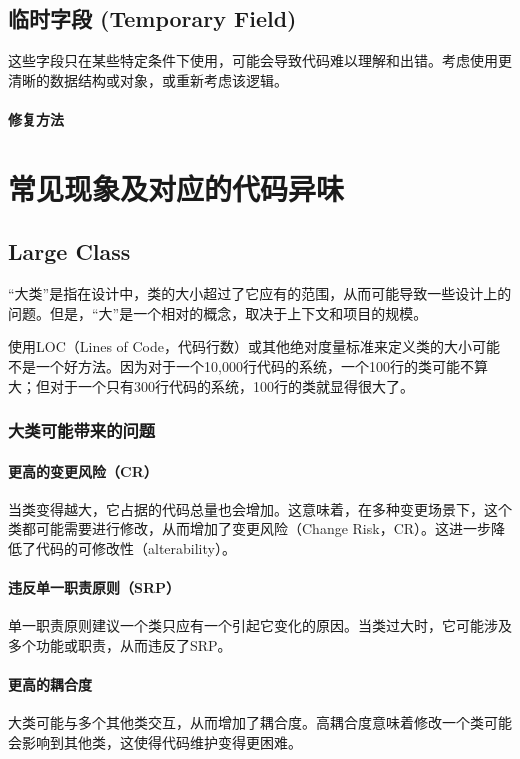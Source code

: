 \subsection{临时字段 (Temporary Field)}这些字段只在某些特定条件下使用，可能会导致代码难以理解和出错。考虑使用更清晰的数据结构或对象，或重新考虑该逻辑。
\paragraph{修复方法}

\section{常见现象及对应的代码异味}
\subsection{Large Class}
“大类”是指在设计中，类的大小超过了它应有的范围，从而可能导致一些设计上的问题。但是，“大”是一个相对的概念，取决于上下文和项目的规模。

使用LOC（Lines of Code，代码行数）或其他绝对度量标准来定义类的大小可能不是一个好方法。因为对于一个10,000行代码的系统，一个100行的类可能不算大；但对于一个只有300行代码的系统，100行的类就显得很大了。

\subsubsection{大类可能带来的问题}

\paragraph{更高的变更风险（CR）}当类变得越大，它占据的代码总量也会增加。这意味着，在多种变更场景下，这个类都可能需要进行修改，从而增加了变更风险（Change Risk，CR）。这进一步降低了代码的可修改性（alterability）。

\paragraph{违反单一职责原则（SRP）}单一职责原则建议一个类只应有一个引起它变化的原因。当类过大时，它可能涉及多个功能或职责，从而违反了SRP。

\paragraph{更高的耦合度}大类可能与多个其他类交互，从而增加了耦合度。高耦合度意味着修改一个类可能会影响到其他类，这使得代码维护变得更困难。

